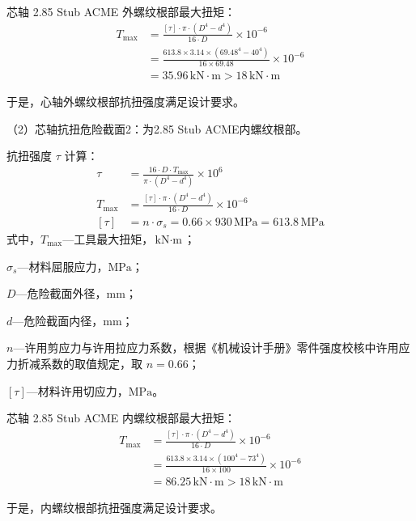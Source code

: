 芯轴 2.85 Stub ACME 外螺纹根部最大扭矩：
\begin{align}
    T_{\max} &= \frac{[\tau] \cdot \pi \cdot (D^4 - d^4)}{16 \cdot D} \times 10^{-6} \\
             &= \frac{613.8 \times 3.14 \times (69.48^4 - 40^4)}{16 \times 69.48} \times 10^{-6} \\
             &= 35.96\,\text{kN}\cdot\text{m} > 18\,\text{kN}\cdot\text{m}
\end{align}

于是，心轴外螺纹根部抗扭强度满足设计要求。

（2）芯轴抗扭危险截面2：为2.85 Stub ACME内螺纹根部。

抗扭强度 $\tau$ 计算：
\begin{align}
    \tau &= \frac{16 \cdot D \cdot T_{\max}}{\pi \cdot (D^4 - d^4)} \times 10^6 \\
    T_{\max} &= \frac{[\tau] \cdot \pi \cdot (D^4 - d^4)}{16 \cdot D} \times 10^{-6} \\
    [\tau] &= n \cdot \sigma_s = 0.66 \times 930\,\text{MPa} = 613.8\,\text{MPa}
\end{align}
式中，$T_{\max}$---工具最大扭矩，$\text{kN}\cdot\text{m}$；

$\sigma_s$---材料屈服应力，$\text{MPa}$；

$D$---危险截面外径，$\text{mm}$；

$d$---危险截面内径，$\text{mm}$；

$n$---许用剪应力与许用拉应力系数，根据《机械设计手册》零件强度校核中许用应力折减系数的取值规定\cite{ref26}，取 $n = 0.66$；

$[\tau]$---材料许用切应力，$\text{MPa}$。

芯轴 2.85 Stub ACME 内螺纹根部最大扭矩：
\begin{align}
    T_{\max} &= \frac{[\tau] \cdot \pi \cdot (D^4 - d^4)}{16 \cdot D} \times 10^{-6} \\
             &= \frac{613.8 \times 3.14 \times (100^4 - 73^4)}{16 \times 100} \times 10^{-6} \\
             &= 86.25\,\text{kN}\cdot\text{m} > 18\,\text{kN}\cdot\text{m}
\end{align}

于是，内螺纹根部抗扭强度满足设计要求。

